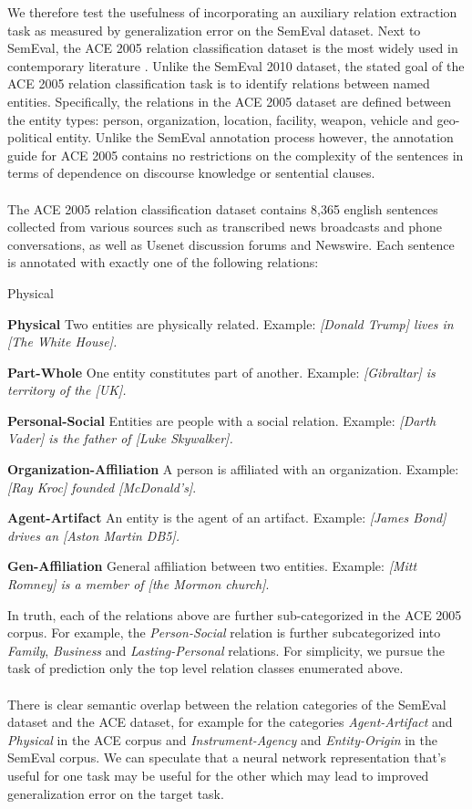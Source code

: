 We therefore test the usefulness of incorporating an auxiliary relation extraction task as measured by generalization error on the SemEval dataset. Next to SemEval, the ACE 2005 relation classification dataset is the most widely used in contemporary literature  \citep{walker2006}. Unlike the SemEval 2010 dataset, the stated goal of the ACE 2005 relation classification task is to identify relations between named entities. Specifically, the relations in the ACE 2005 dataset are defined between the entity types: person, organization, location, facility, weapon, vehicle and geo-political entity. Unlike the SemEval annotation process however, the annotation guide for ACE 2005  contains no restrictions on the complexity of the sentences in terms of dependence on discourse knowledge or sentential clauses.
\\\\
The ACE 2005 relation classification dataset contains 8,365 english sentences collected from various sources such as transcribed news broadcasts and phone conversations, as well as Usenet discussion forums and Newswire. Each sentence is annotated with exactly one of the following relations:
\begin{labeling}{Physical}
	\item \textbf{Physical} Two entities are physically related. Example: \textit{[Donald Trump] lives in [The White House].}
	\item \textbf{Part-Whole} One entity constitutes part of another. Example: \textit{[Gibraltar] is territory of the [UK].}
	\item \textbf{Personal-Social} Entities are people with a social relation. Example: \textit{[Darth Vader] is the father of [Luke Skywalker].}
	\item \textbf{Organization-Affiliation} A person is affiliated with an organization. Example: \textit{[Ray Kroc] founded [McDonald's]}.
	\item \textbf{Agent-Artifact} An entity is the agent of an artifact. Example: \textit{[James Bond] drives an [Aston Martin DB5].}
	\item \textbf{Gen-Affiliation} General affiliation between two entities. Example: \textit{[Mitt Romney] is a member of [the Mormon church]}.
\end{labeling}
In truth, each of the relations above are further sub-categorized in the ACE 2005 corpus. For example, the \textit{Person-Social} relation is further subcategorized into \textit{Family}, \textit{Business} and \textit{Lasting-Personal} relations. For simplicity, we pursue the task of prediction only the top level relation classes enumerated above.
\\\\
There is clear semantic overlap between the relation categories of the SemEval dataset and the ACE dataset, for example for the categories \textit{Agent-Artifact} and \textit{Physical} in the ACE corpus and \textit{Instrument-Agency} and \textit{Entity-Origin} in the SemEval corpus. We can speculate that a neural network representation that's useful for one task may be useful for the other which may lead to improved generalization error on the target task.

